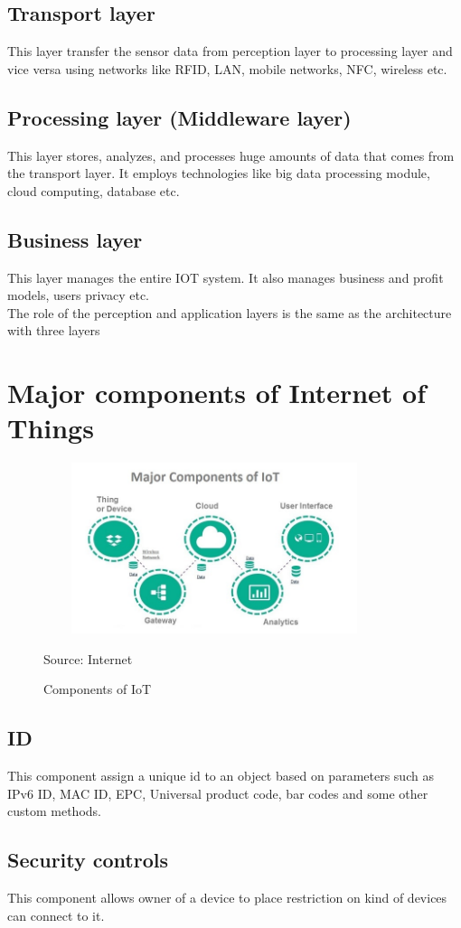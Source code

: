 \documentclass[12pt, a4paper]{report}
\begin{document}
\subsection{Transport layer}
This layer transfer the sensor data from perception layer to processing layer and vice versa using networks like RFID, LAN, mobile networks, NFC, wireless etc.
\subsection{Processing layer (Middleware layer)}
 This layer stores, analyzes, and processes huge amounts of data that comes from the transport layer. It employs technologies like big data processing module, cloud computing, database etc.
 \subsection{Business layer}
 This layer manages the entire IOT system. It also manages business and profit models, users privacy etc.\\
The role of the perception and application layers is the same as the architecture with three layers
\section{Major components of Internet of Things}
\begin{figure}[h]
\centering
\includegraphics[width=10cm, height=5cm]{Components}
\caption{Components of IoT}{Source: Internet}
\label{figure-5}
\end{figure}
\subsection{ID}
This component assign a unique id to an object based on parameters such as IPv6 ID, MAC ID, EPC, Universal product code, bar codes and some other custom methods.
\subsection{Security controls}
This component allows owner of a device to place restriction on kind of devices can connect to it.
\end{document}
